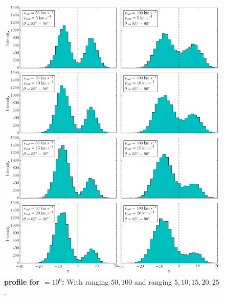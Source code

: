 \begin{figure}[h!]
	\begin{center}
		\includegraphics[width=1\textwidth]{./figures/chapter3/3_tau10E6_phi83-90}
	\end{center}
	\caption{\textbf{\lya profile for \tauh$=10^6$:} With \vrot ranging $50,100$ \kms and \vout ranging $5,10,15,20,25$ \kms.
		\label{fig:3_tau10E6_phi83-90}}
\end{figure}

